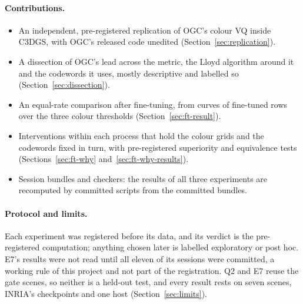 \paragraph{Contributions.}
\begin{itemize}
\item An independent, pre-registered replication of OGC's colour VQ inside C3DGS, with OGC's released code unedited (Section~\ref{sec:replication}). %
\item A dissection of OGC's lead across the metric, the Lloyd algorithm around it and the codewords it uses, mostly descriptive and labelled so (Section~\ref{sec:dissection}). %
\item An equal-rate comparison after fine-tuning, from curves of fine-tuned rows over the three colour thresholds (Section~\ref{sec:ft-result}). %
\item Interventions within each process that hold the colour grids and the codewords fixed in turn, with pre-registered superiority and equivalence tests (Sections~\ref{sec:ft-why} and~\ref{sec:ft-why-results}). %
\item Session bundles and checkers: the results of all three experiments are recomputed by committed scripts from the committed bundles. %
\end{itemize}

\paragraph{Protocol and limits.}
Each experiment was registered before its data, and its verdict is the pre-registered computation; anything chosen later is labelled exploratory or post hoc. %
E7's results were not read until all eleven of its sessions were committed, a working rule of this project and not part of the registration. %
Q2 and E7 reuse the gate scenes, so neither is a held-out test, and every result rests on seven scenes, INRIA's checkpoints and one host (Section~\ref{sec:limits}). %
